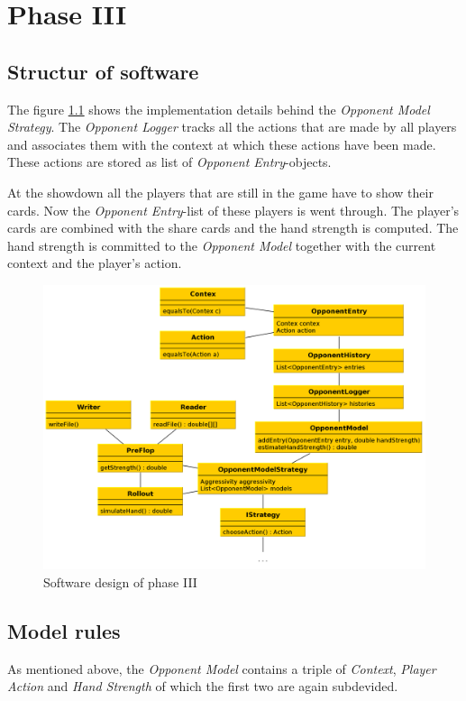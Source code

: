 \chapter{Phase III}

\section{Structur of software}
The figure \ref{fig:phase3} shows the implementation details behind the \emph{Opponent Model Strategy}. The \emph{Opponent Logger} tracks all the actions that are made by all players and associates them with the context at which these actions have been made. These actions are stored as list of \emph{Opponent Entry}-objects. 

At the showdown all the players that are still in the game have to show their cards. Now the \emph{Opponent Entry}-list of these players is went through. The player's cards are combined with the share cards and the hand strength is computed. The hand strength is committed to the \emph{Opponent Model} together with the current context and the player's action.

\begin{figure}[h]
  \centering
  \includegraphics[width=1.0\textwidth]{images/phase3}
  \caption{Software design of phase III}
  \label{fig:phase3}
\end{figure}

\section{Model rules}
As mentioned above, the \emph{Opponent Model} contains  a triple of \emph{Context}, \emph{Player Action} and \emph{Hand Strength} of which the first two are again subdevided.

